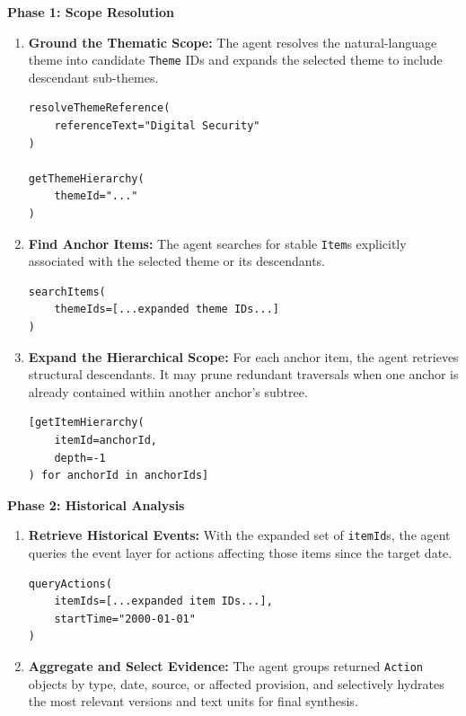\documentclass[11pt]{article}
\begin{document}
\textbf{Phase 1: Scope Resolution}
\begin{enumerate}[noitemsep, topsep=0pt]
    \item \textbf{Ground the Thematic Scope:} The agent resolves the natural-language theme into candidate \texttt{Theme} IDs and expands the selected theme to include descendant sub-themes.
    \begin{lstlisting}[style=tablecode]
resolveThemeReference(
    referenceText="Digital Security"
)

getThemeHierarchy(
    themeId="..."
)
    \end{lstlisting}

    \item \textbf{Find Anchor Items:} The agent searches for stable \texttt{Item}s explicitly associated with the selected theme or its descendants.
    \begin{lstlisting}[style=tablecode]
searchItems(
    themeIds=[...expanded theme IDs...]
)
    \end{lstlisting}

    \item \textbf{Expand the Hierarchical Scope:} For each anchor item, the agent retrieves structural descendants. It may prune redundant traversals when one anchor is already contained within another anchor's subtree.
    \begin{lstlisting}[style=tablecode]
[getItemHierarchy(
    itemId=anchorId,
    depth=-1
) for anchorId in anchorIds]
    \end{lstlisting}
\end{enumerate}

\textbf{Phase 2: Historical Analysis}
\begin{enumerate}[noitemsep, topsep=0pt, resume]
    \item \textbf{Retrieve Historical Events:} With the expanded set of \texttt{itemId}s, the agent queries the event layer for actions affecting those items since the target date.
    \begin{lstlisting}[style=tablecode]
queryActions(
    itemIds=[...expanded item IDs...],
    startTime="2000-01-01"
)
    \end{lstlisting}

    \item \textbf{Aggregate and Select Evidence:} The agent groups returned \texttt{Action} objects by type, date, source, or affected provision, and selectively hydrates the most relevant versions and text units for final synthesis.
\end{enumerate}
\end{document}
